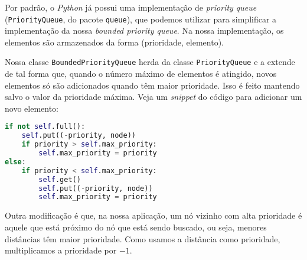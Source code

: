         Por padrão, o \textit{Python} já possui uma implementação de \textit{priority queue} (\lstinline{PriorityQueue}, do pacote \lstinline{queue}), que podemos utilizar para simplificar a implementação da nossa \textit{bounded priority queue}. Na nossa implementação, os elementos são armazenados da forma (prioridade, elemento).
        
        Nossa classe \lstinline{BoundedPriorityQueue} herda da classe \lstinline{PriorityQueue} e a extende de tal forma que, quando o número máximo de elementos é atingido, novos elementos só são adicionados quando têm maior prioridade. Isso é feito mantendo salvo o valor da prioridade máxima. Veja um \textit{snippet} do código para adicionar um novo elemento:
        \begin{lstlisting}[language=Python]
if not self.full():
    self.put((-priority, node))
    if priority > self.max_priority:
        self.max_priority = priority
else:
    if priority < self.max_priority:
        self.get()
        self.put((-priority, node))
        self.max_priority = priority
        \end{lstlisting}
        Outra modificação é que, na nossa aplicação, um nó vizinho com alta prioridade é aquele que está próximo do nó que está sendo buscado, ou seja, menores distâncias têm maior prioridade. Como usamos a distância como prioridade, multiplicamos a prioridade por $-1$.
